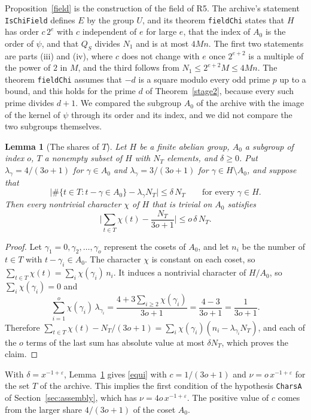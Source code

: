 \documentclass[11pt,letterpaper]{article}
\newtheorem{lemma}[theorem]{Lemma}
\numberwithin{equation}{section}
\begin{document}
Proposition~\ref{field} is the construction of the field of R5. The archive's statement \texttt{IsChiField} defines $E$ by the group $U$, and its theorem \texttt{fieldChi} states that $H$ has order $c\,2^e$ with $c$ independent of $e$ for large $e$, that the index of $A_0$ is the order of $\psi$, and that $Q_S$ divides $N_1$ and is at most $4Mn$. The first two statements are parts (iii) and (iv), where $c$ does not change with $e$ once $2^{e+2}$ is a multiple of the power of $2$ in $M$, and the third follows from $N_1\le2^{e+2}M\le4Mn$. The theorem \texttt{fieldChi} assumes that $-d$ is a square modulo every odd prime $p$ up to a bound, and this holds for the prime $d$ of Theorem~\ref{stage2}, because every such prime divides $d+1$. We compared the subgroup $A_0$ of the archive with the image of the kernel of $\psi$ through its order and its index, and we did not compare the two subgroups themselves.

\begin{lemma}[The shares of $T$]\label{shares}
Let $H$ be a finite abelian group, $A_0$ a subgroup of index $o$, $T$ a nonempty subset of $H$ with $N_T$ elements, and $\delta\ge0$. Put $\lambda_\gamma=4/(3o+1)$ for $\gamma\in A_0$ and $\lambda_\gamma=3/(3o+1)$ for $\gamma\in H\setminus A_0$, and suppose that
\[
\Big|\#\{t\in T:t-\gamma\in A_0\}-\lambda_\gamma N_T\Big|\le\delta\,N_T\qquad\text{for every }\gamma\in H .
\]
Then every nontrivial character $\chi$ of $H$ that is trivial on $A_0$ satisfies
\[
\Big|\sum_{t\in T}\chi(t)-\frac{N_T}{3o+1}\Big|\le o\,\delta\,N_T .
\]
\end{lemma}
\begin{proof}
Let $\gamma_1=0,\gamma_2,\dots,\gamma_o$ represent the cosets of $A_0$, and let $n_i$ be the number of $t\in T$ with $t-\gamma_i\in A_0$. The character $\chi$ is constant on each coset, so $\sum_{t\in T}\chi(t)=\sum_i\chi(\gamma_i)\,n_i$. It induces a nontrivial character of $H/A_0$, so $\sum_i\chi(\gamma_i)=0$ and
\[
\sum_{i=1}^o\chi(\gamma_i)\,\lambda_{\gamma_i}=\frac{4+3\sum_{i\ge2}\chi(\gamma_i)}{3o+1}=\frac{4-3}{3o+1}=\frac1{3o+1}.
\]
Therefore $\sum_{t\in T}\chi(t)-N_T/(3o+1)=\sum_i\chi(\gamma_i)(n_i-\lambda_{\gamma_i}N_T)$, and each of the $o$ terms of the last sum has absolute value at most $\delta N_T$, which proves the claim.
\end{proof}

With $\delta=x^{-1+\varepsilon}$, Lemma~\ref{shares} gives \eqref{equi} with $c=1/(3o+1)$ and $\nu=o\,x^{-1+\varepsilon}$ for the set $T$ of the archive. This implies the first condition of the hypothesis \texttt{CharsA} of Section~\ref{sec:assembly}, which has $\nu=4o\,x^{-1+\varepsilon}$. The positive value of $c$ comes from the larger share $4/(3o+1)$ of the coset $A_0$.
\end{document}
